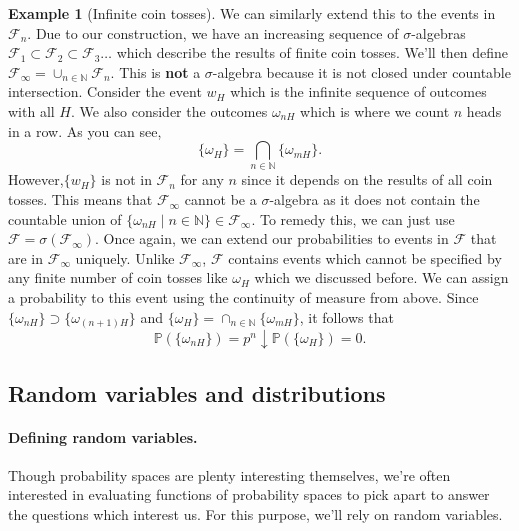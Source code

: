 \documentclass[12pt]{article}
\newcommand{\bbN}{\mathbb{N}}
\newcommand{\calF}{\mathcal{F}}
\newcommand{\Prob}{\mathbb{P}}
\theoremstyle{definition}
\newtheorem{exmp}[thm]{Example}
\theoremstyle{remark}
\numberwithin{equation}{section}
\begin{document}
\begin{exmp}[Infinite coin tosses]
We can similarly extend this to the events in $\calF_n$. Due to our construction, we have an increasing sequence of $\sigma$-algebras $\calF_1 \subset \calF_2 \subset \calF_3 \ldots$ which describe the results of finite coin tosses. We'll then define $\calF_\infty = \cup_{n\in\bbN} \calF_n$. This is \textbf{not} a $\sigma$-algebra because it is not closed under countable intersection. Consider the event $w_H$ which is the infinite sequence of outcomes with all $H$. We also consider the outcomes $\omega_{nH}$ which is where we count $n$ heads in a row. As you can see,
\begin{equation}  
  \{\omega_H \} = \bigcap_{n\in\bbN} \{\omega_{mH}\}.
\end{equation}
However,$ \{ w_H\}$ is not in $\calF_n$ for any $n$ since it depends on the results of all coin tosses. This means that $\calF_\infty$ cannot be a $\sigma$-algebra as it does not contain the countable union of $\{ \omega_{nH}\mid n\in\bbN\} \in \calF_\infty$. To remedy this, we can just use $\calF = \sigma(\calF_\infty)$. Once again, we can extend our probabilities to events in $\calF$ that are in $\calF_\infty$ uniquely. Unlike $\calF_\infty$, $\calF$ contains events which cannot be specified by any finite number of coin tosses like $\omega_H$ which we discussed before. We can assign a probability to this event using the continuity of measure from above. Since $\{\omega_{nH}\} \supset \{\omega_{(n+1)H}\}$ and $\{\omega_H \} = \cap_{n\in\bbN} \{\omega_{mH}\}$, it follows that 
\begin{equation}
  \Prob(\{\omega_{nH} \}) = p^n \downarrow \Prob(\{\omega_H\}) = 0.
\end{equation}
\end{exmp}

\subsection{Random variables and distributions}%
\label{sub:random_variables_and_distributions}

\paragraph{Defining random variables.}%
\label{par:defining_random_variables_}

Though probability spaces are plenty interesting themselves, we're often interested in evaluating functions of probability spaces to pick apart to answer the questions which interest us. For this purpose, we'll rely on random variables.
\end{document}
